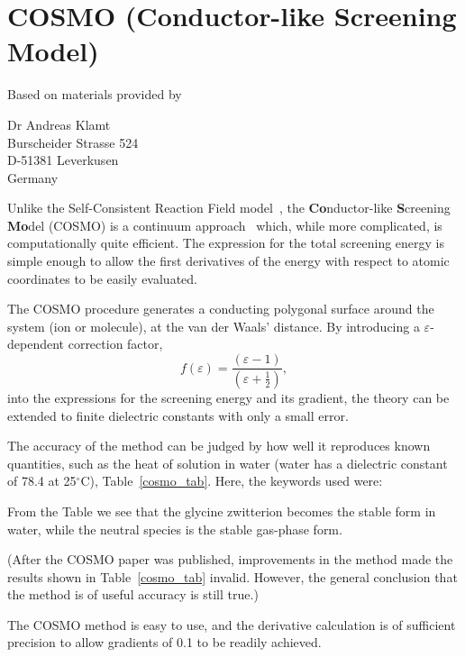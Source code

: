 \section{COSMO (Conductor-like Screening Model)}
Based on materials provided by
\begin{center}
Dr Andreas Klamt \\
Burscheider Strasse 524 \\
D-51381 Leverkusen \\
Germany \\
\end{center}

Unlike the Self-Consistent Reaction Field model~\cite{scrf}, the  {\bf
Co}nductor-like {\bf S}creening {\bf Mo}del (COSMO) is a  continuum
approach~\cite{cosmo} which, while more  complicated, is computationally quite
efficient.  The expression for the total screening energy is simple enough to
allow the first derivatives of the energy with respect to atomic  coordinates
to be easily evaluated.

The COSMO procedure generates a conducting polygonal surface around the system
(ion or molecule), at the van der Waals' distance.  By introducing a
$\varepsilon$-dependent correction factor,
$$
f(\varepsilon)=\frac{(\varepsilon-1)}{(\varepsilon+\frac{1}{2})}, 
$$
into the expressions for the screening energy and its gradient, the theory can
be extended to finite dielectric constants with only a small error.

The accuracy of the method can be judged by how well it reproduces known
quantities, such as the heat of solution in water (water has a dielectric
constant of 78.4 at 25$^{\circ}$C), Table~\ref{cosmo_tab}.   Here, the keywords
used were:


From the Table we see that the glycine zwitterion becomes the stable form in
water, while the neutral species is the stable gas-phase form.

(After the COSMO paper was published, improvements in the method made the
results shown in Table~\ref{cosmo_tab} invalid.  However, the general
conclusion that the method is of useful accuracy is still true.)

The COSMO method is easy to use, and the derivative calculation is of
sufficient precision to allow gradients of 0.1 to be readily achieved.

